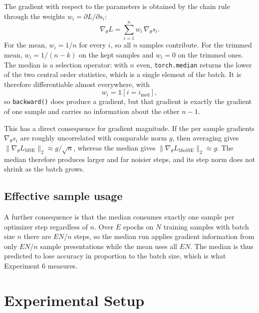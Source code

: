\documentclass[12pt]{article}
\begin{document}
The gradient with respect to the parameters is obtained by the chain rule through the weights $w_i = \partial L / \partial s_i$:
\begin{equation}
\nabla_\theta L = \sum_{i=1}^{n} w_i \, \nabla_\theta s_i .
\end{equation}
For the mean, $w_i = 1/n$ for every $i$, so all $n$ samples contribute. For the trimmed mean, $w_i = 1/(n-k)$ on the kept samples and $w_i = 0$ on the trimmed ones. The median is a selection operator: with $n$ even, \texttt{torch.median} returns the lower of the two central order statistics, which is a single element of the batch. It is therefore differentiable almost everywhere, with
\begin{equation}
w_i = \mathbb{1}\!\left[ i = i_{\mathrm{med}} \right] ,
\end{equation}
so \texttt{backward()} does produce a gradient, but that gradient is exactly the gradient of one sample and carries no information about the other $n-1$.

This has a direct consequence for gradient magnitude. If the per sample gradients $\nabla_\theta s_i$ are roughly uncorrelated with comparable norm $g$, then averaging gives $\|\nabla_\theta L_{\mathrm{MSE}}\|_2 \approx g/\sqrt{n}$, whereas the median gives $\|\nabla_\theta L_{\mathrm{MedSE}}\|_2 \approx g$. The median therefore produces larger and far noisier steps, and its step norm does not shrink as the batch grows.

\subsection{Effective sample usage}

A further consequence is that the median consumes exactly one sample per optimizer step regardless of $n$. Over $E$ epochs on $N$ training samples with batch size $n$ there are $EN/n$ steps, so the median run applies gradient information from only $EN/n$ sample presentations while the mean uses all $EN$. The median is thus predicted to lose accuracy in proportion to the batch size, which is what Experiment 6 measures.

\section{Experimental Setup}
\end{document}
